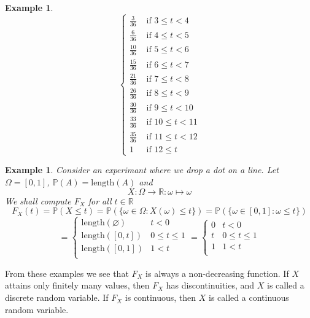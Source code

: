 \documentclass[12pt]{article}
\newtheorem{example}[theorem]{Example}
\begin{document}
\begin{example}
$$\begin{cases}
            \frac{3}{36}  & \mbox { if } 3 \leq t < 4   \\
            \frac{6}{36}  & \mbox { if } 4 \leq t < 5   \\
            \frac{10}{36} & \mbox { if } 5 \leq t < 6   \\
            \frac{15}{36} & \mbox { if } 6 \leq t < 7   \\
            \frac{21}{36} & \mbox { if } 7 \leq t < 8   \\
            \frac{26}{36} & \mbox { if } 8 \leq t < 9   \\
            \frac{30}{36} & \mbox { if } 9 \leq t < 10  \\
            \frac{33}{36} & \mbox { if } 10 \leq t < 11 \\
            \frac{35}{36} & \mbox { if } 11 \leq t < 12 \\
            1             & \mbox { if }12 \leq t
        \end{cases}
    $$
\end{example}

\begin{example} Consider an experimant where we drop a dot on a line. 
    Let $\Omega=[0,1]$,
    $\mathbb{P}(A)=\mbox{length}(A)$ and
    $$
        X:\Omega\to\mathbb{R}:\omega\mapsto \omega
    $$
    We shall compute $F_X$ for all $t\in\mathbb{R}$
    $$
        F_X(t)
        =\mathbb{P}(X\leq t)
        =\mathbb{P}(\{\omega\in\Omega:X(\omega)\leq t\})
        =\mathbb{P}(\{\omega\in[0,1]:\omega\leq t\})
    $$
    $$
        =\begin{cases}
            \mbox{length}(\varnothing) & t < 0          \\
            \mbox{length}([0,t])       & 0\leq t \leq 1 \\
            \mbox{length}([0,1])       & 1 < t          \\
        \end{cases}
        =\begin{cases}
            0 & t < 0          \\
            t & 0\leq t \leq 1 \\
            1 & 1 < t          \\
        \end{cases}
    $$
\end{example}

From these examples we see that $F_X$ is always a non-decreasing function. 
If $X$ attains only finitely many values, then $F_X$ has discontinuities, 
and $X$ is called a discrete random variable. If $F_X$ is continuous, 
then $X$ is called a continuous random variable.
\end{document}
